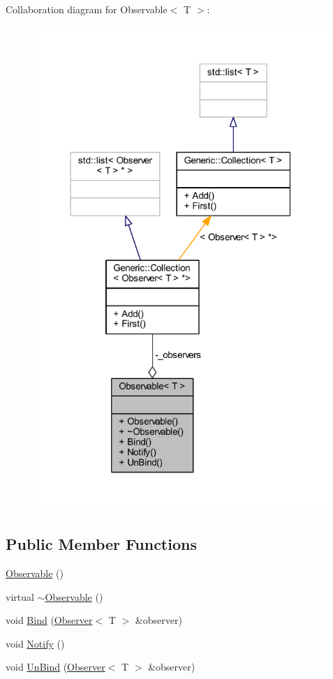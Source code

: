 Collaboration diagram for Observable$<$ T $>$\+:
\nopagebreak
\begin{figure}[H]
\begin{center}
\leavevmode
\includegraphics[width=316pt]{classObservable__coll__graph}
\end{center}
\end{figure}
\subsection*{Public Member Functions}
\begin{DoxyCompactItemize}
\item 
\mbox{\hyperlink{classObservable_a6cec7a5329100b5d45b078ff4bcd5f88}{Observable}} ()
\item 
virtual \mbox{\hyperlink{classObservable_a6d06df1c0feb2ce5a30c6fb7119c4045}{$\sim$\+Observable}} ()
\item 
void \mbox{\hyperlink{classObservable_aedd54eccbfad67066226ee0b958347ba}{Bind}} (\mbox{\hyperlink{classObserver}{Observer}}$<$ T $>$ \&observer)
\item 
void \mbox{\hyperlink{classObservable_afaa016d6c6b8a6fad20bb388d35ca014}{Notify}} ()
\item 
void \mbox{\hyperlink{classObservable_a141ac9aaacb2bf98b41349413c3487c0}{Un\+Bind}} (\mbox{\hyperlink{classObserver}{Observer}}$<$ T $>$ \&observer)
\end{DoxyCompactItemize}

